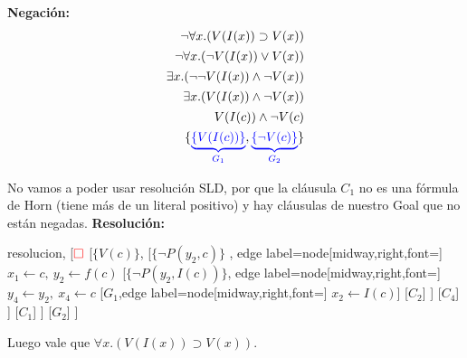\documentclass[10pt,a4paper]{article}
\begin{document}
\textbf{Negación:}
\begin{align*}
\lnot\forall x.(V (I(x)) \supset V (x)) \\[1pt]
\lnot\forall x.(\lnot V (I(x)) \lor V (x)) \\[1pt]
\exists x.(\lnot\lnot V (I(x)) \land \lnot V (x)) \\[1pt]
\exists x.(V (I(x)) \land \lnot V (x)) \\[1pt]
V (I(c)) \land \lnot V (c) \\[1pt]
\{{\color{blue}\underbrace{\{V (I(c))\}}_{G_1}},{\color{blue}\underbrace{\{\lnot V (c)\}}_{G_2}}\} \\[1pt]
\end{align*}

 No vamos a poder usar resolución SLD, por que la cláusula $C_1$ no es una fórmula de Horn (tiene más de un literal positivo) y hay cláusulas de nuestro Goal que no están negadas.
\textbf{Resolución:}
\begin{center}
	\begin{forest} resolucion,
[${\color{red}\Box}$ 
        	[$\{V(c)\}$,
            	[$\{\lnot P(y_2\comma c)\}$
            	, edge label={node[midway,right,font=\footnotesize] {$x_1\leftarrow c,~y_2\leftarrow f(c)$}}
                	[$\{\lnot P(y_2\comma I(c))\}$, edge label={node[midway,right,font=\footnotesize] {$y_4\leftarrow y_2,~x_4\leftarrow c$}}
                    	[$G_1$,edge label={node[midway,right,font=\footnotesize] {$x_2\leftarrow I(c)$}}]
                    	[$C_2$]
                	]
                	[$C_4$]
            	]
            	[$C_1$]
        	]
        	[$G_2$]
]
	\end{forest}
\end{center}
Luego vale que $\forall x.(V (I(x)) \supset V (x))$.
\end{document}
